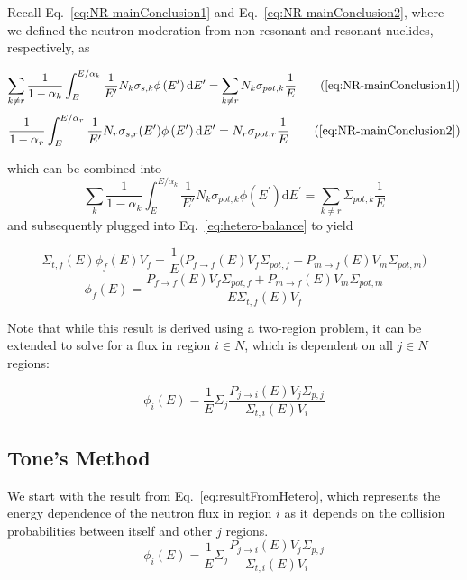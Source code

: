 \documentclass[10pt]{article}
\begin{document}
 Recall Eq.~\ref{eq:NR-mainConclusion1} and Eq.~\ref{eq:NR-mainConclusion2}, where we defined the neutron moderation from non-resonant and resonant nuclides, respectively, as

\begin{equation*}\sum\limits_{k\neq r}\frac{1}{1-\alpha_{k}}\int_{E}^{E/\alpha_{k}}\frac{1}{E'}N_{k}\sigma_{s,k}\phi\left(E^{\prime}\right)\mathrm{d}E^{\prime}=\sum\limits_{k\neq r}N_{k}\sigma_{pot,k}\frac{1}{E}\tag{\ref{eq:NR-mainConclusion1}}\end{equation*}
\begin{equation*}
  \frac{1}{1-\alpha_r}\int_{E}^{E/\alpha_{r}}\frac{1}{E'}N_{r}\sigma_{s,r}(E')\phi\left(E'\right)\mathrm{d}E^{\prime}=N_{r}\sigma_{pot,r}\frac{1}{E}
  \tag{\ref{eq:NR-mainConclusion2}}
\end{equation*}

which can be combined into
\begin{equation}\sum\limits_{k}\frac{1}{1-\alpha_{k}}\int_{E}^{E/\alpha_{k}}\frac{1}{E'}N_{k}\sigma_{pot,k}\phi\left(E^{\prime}\right)\mathrm{d}E^{\prime}=\sum\limits_{k\neq r}\Sigma_{pot,k}\frac{1}{E}\end{equation}
and subsequently plugged into Eq.~\ref{eq:hetero-balance} to yield


\begin{equation}\Sigma_{t,f}(E)\phi_{f}(E)V_{f}=\frac{1}{E}\Big(P_{f\rightarrow f}(E)V_{f}\Sigma_{pot,f}+P_{m\rightarrow f}(E)V_{m}\Sigma_{pot,m}\Big)\end{equation}
\begin{equation}\phi_{f}(E)=\frac{P_{f\rightarrow f}(E)V_f\Sigma_{pot,f}+P_{m\rightarrow f}(E)V_m\Sigma_{pot,m}}{E\Sigma_{t,f}(E)V_f}\end{equation}

Note that while this result is derived using a two-region problem, it can be extended to solve for a flux in region $i\in N$, which is dependent on all $j\in N$ regions:

\begin{equation}\phi_{i}(E)=\frac{1}{E}\Sigma_j\frac{P_{j\rightarrow i}(E)V_{j}\Sigma_{p,j}}{\Sigma_{t,i}(E)V_{i}}\label{eq:resultFromHetero}\end{equation}




\subsection*{Tone's Method}
We start with the result from Eq.~\ref{eq:resultFromHetero}, which represents the energy dependence of the neutron flux in region $i$ as it depends on the collision probabilities between itself and other $j$ regions.
\begin{equation}\phi_{i}(E)=\frac{1}{E}\Sigma_j\frac{P_{j\rightarrow i}(E)V_{j}\Sigma_{p,j}}{\Sigma_{t,i}(E)V_{i}}\end{equation}
\end{document}
